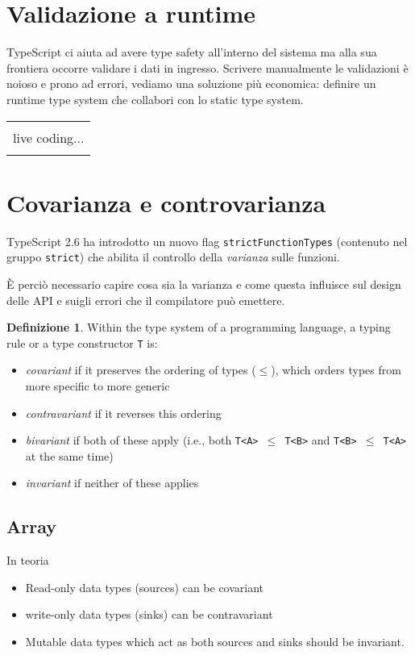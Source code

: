\documentclass[12pt]{article}
\theoremstyle{definition}
\newtheorem{definition}{Definizione}[section]
\newenvironment{boxed}
    {\begin{center}
    \begin{tabular}{|p{0.9\textwidth}|}
    \hline\\
    }
    {
    \\\\\hline
    \end{tabular}
    \end{center}
    }
\begin{document}
\newpage
\section{Validazione a runtime}

TypeScript ci aiuta ad avere type safety all'interno del sistema ma alla sua frontiera occorre validare i dati in ingresso.
Scrivere manualmente le validazioni è noioso e prono ad errori, vediamo una soluzione più economica:
definire un runtime type system che collabori con lo static type system.

\begin{boxed}
live coding...
\end{boxed}

\newpage
\section{Covarianza e controvarianza}

TypeScript 2.6 ha introdotto un nuovo flag \texttt{strictFunctionTypes} (contenuto nel gruppo \texttt{strict})
che abilita il controllo della \emph{varianza} sulle funzioni.

È perciò necessario capire cosa sia la varianza e come questa influisce sul design delle API e suigli errori che il compilatore può emettere.

\begin{definition}
Within the type system of a programming language, a typing rule or a type constructor \texttt{T} is:
\begin{itemize}
\item \emph{covariant} if it preserves the ordering of types ($\leq$), which orders types from more specific to more generic
\item \emph{contravariant} if it reverses this ordering
\item \emph{bivariant} if both of these apply (i.e., both \texttt{T<A> $\leq$ T<B>} and \texttt{T<B> $\leq$ T<A>} at the same time)
\item \emph{invariant} if neither of these applies
\end{itemize}
\end{definition}

\subsection{Array}

In teoria

\begin{itemize}
  \item Read-only data types (sources) can be covariant
  \item write-only data types (sinks) can be contravariant
  \item Mutable data types which act as both sources and sinks should be invariant.
\end{itemize}
\end{document}
